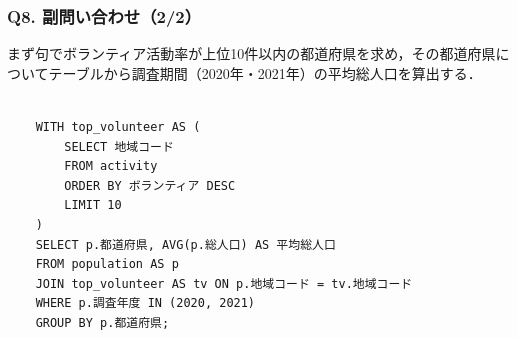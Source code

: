 \subsubsection*{Q8. 副問い合わせ（2/2）}
まず句でボランティア活動率が上位10件以内の都道府県を求め，その都道府県についてテーブルから調査期間（2020年・2021年）の平均総人口を算出する．
\begin{verbatim}

    WITH top_volunteer AS (
        SELECT 地域コード
        FROM activity
        ORDER BY ボランティア DESC
        LIMIT 10
    )
    SELECT p.都道府県, AVG(p.総人口) AS 平均総人口
    FROM population AS p
    JOIN top_volunteer AS tv ON p.地域コード = tv.地域コード
    WHERE p.調査年度 IN (2020, 2021)
    GROUP BY p.都道府県;

\end{verbatim}
